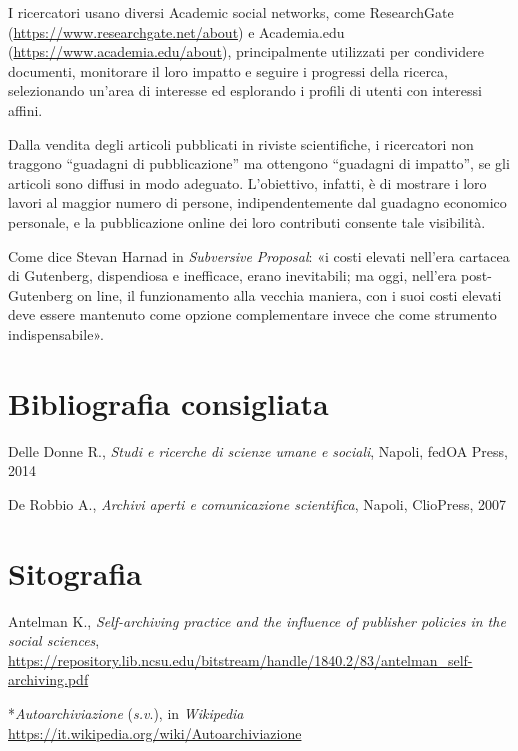 \documentclass[
  b5paper,
  twoside,
  12pt,
  chapterprefix=false,
  bibliography=totocnumbered,
  parskip=false]{scrbook}
\begin{document}
I ricercatori usano diversi Academic social networks, come ResearchGate
(\url{https://www.researchgate.net/about})
e Academia.edu
(\url{https://www.academia.edu/about}),
principalmente utilizzati per condividere documenti, monitorare il loro
impatto e seguire i progressi della ricerca, selezionando un'area di
interesse ed esplorando i profili di utenti con interessi affini.

Dalla vendita degli articoli pubblicati in riviste scientifiche, i
ricercatori non traggono \enquote{guadagni di pubblicazione} ma ottengono
\enquote{guadagni di impatto}, se gli articoli sono diffusi in modo adeguato.
L'obiettivo, infatti, è di mostrare i loro lavori al maggior numero di
persone, indipendentemente dal guadagno economico personale, e la
pubblicazione online dei loro contributi consente tale visibilità.

Come dice Stevan Harnad in \emph{Subversive} \emph{Proposal}: «i costi elevati
nell'era cartacea di Gutenberg, dispendiosa e inefficace, erano
inevitabili; ma oggi, nell'era post-Gutenberg on line, il funzionamento
alla vecchia maniera, con i suoi costi elevati deve essere mantenuto
come opzione complementare invece che come strumento indispensabile».

\hypertarget{bibliografia-consigliata-22}{%
\section*{Bibliografia consigliata}\label{bibliografia-consigliata-22}}

Delle Donne R., \emph{Studi e ricerche di scienze umane e sociali}, Napoli,
fedOA Press, 2014

De Robbio A., \emph{Archivi aperti e comunicazione scientifica}, Napoli,
ClioPress, 2007

\hypertarget{sitografia-28}{%
\section*{Sitografia}\label{sitografia-28}}

Antelman K., \emph{Self-archiving practice and the influence of publisher
policies in the social sciences},
\url{https://repository.lib.ncsu.edu/bitstream/handle/1840.2/83/antelman_self-archiving.pdf}

*\emph{Autoarchiviazione} (\emph{s.v}.), in \emph{Wikipedia}
\url{https://it.wikipedia.org/wiki/Autoarchiviazione}
\end{document}
